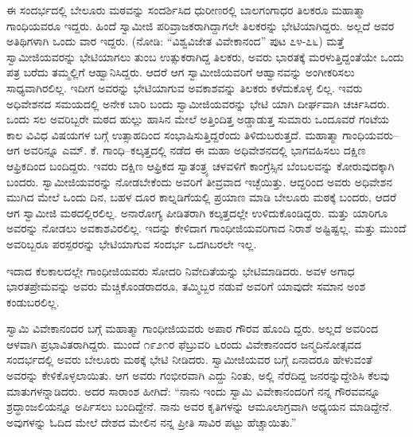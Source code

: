 ಈ ಸಂದರ್ಭದಲ್ಲಿ ಬೇಲೂರು ಮಠವನ್ನು ಸಂದರ್ಶಿಸಿದ ಧುರೀಣರಲ್ಲಿ ಬಾಲಗಂಗಾಧರ ತಿಲಕರೂ ಮಹಾತ್ಮಾ ಗಾಂಧಿಯವರೂ ಇದ್ದರು. ಹಿಂದೆ ಸ್ವಾಮೀಜಿ ಪರಿವ್ರಾಜಕರಾಗಿದ್ದಾಗಲೇ ತಿಲಕರನ್ನು ಭೇಟಿಯಾಗಿದ್ದರು. ಅಲ್ಲದೆ ಅವರ ಅತಿಥಿಗಳಾಗಿ ಒಂದು ವಾರ ಇದ್ದರು. (ನೋಡಿ: “ವಿಶ್ವವಿಜೇತ ವಿವೇಕಾನಂದ” ಪುಟ ೭೪-೭೬) ಮತ್ತೆ ಸ್ವಾಮೀಜಿಯವರನ್ನು ಭೇಟಿಯಾಗಲು ತುಂಬ ಉತ್ಸುಕರಾಗಿದ್ದ ತಿಲಕರು, ಅವರು ಭಾರತಕ್ಕೆ ಮರಳುತ್ತಿದ್ದಂತೆಯೇ ಒಂದು ಪತ್ರ ಬರೆದು ತಮ್ಮಲ್ಲಿಗೆ ಆಹ್ವಾನಿಸಿದ್ದರು. ಆದರೆ ಆಗ ಸ್ವಾಮೀಜಿಯವರಿಗೆ ಆಹ್ವಾನವನ್ನು ಅಂಗೀಕರಿಸಲು ಸಾಧ್ಯವಾಗಿರಲಿಲ್ಲ. ಇದೀಗ ಅವರನ್ನು ಭೇಟಿಯಾಗುವ ಅವಕಾಶವನ್ನು ತಿಲಕರು ಕಳೆದುಕೊಳ್ಳ ಲಿಲ್ಲ. ಇವರು ಅಧಿವೇಶನದ ಸಮಯದಲ್ಲಿ ಅನೇಕ ಬಾರಿ ಬಂದು ಸ್ವಾಮೀಜಿಯವರನ್ನು ಭೇಟಿ ಯಾಗಿ ದೀರ್ಘವಾಗಿ ಚರ್ಚಿಸಿದರು. ಒಂದು ಸಲ ಅವರಿಬ್ಬರೇ ಮಠದ ಹುಲ್ಲು ಹಾಸಿನ ಮೇಲೆ ಅತ್ತಿಂದಿತ್ತ ಅಡ್ಡಾಡುತ್ತ ಸುಮಾರು ಒಂದೂವರೆ ಗಂಟೆಯ ಕಾಲ ವಿವಿಧ ವಿಷಯಗಳ ಬಗ್ಗೆ ಉತ್ಸಾಹದಿಂದ ಸಂಭಾಷಿಸುತ್ತಿದ್ದರೆಂದು ತಿಳಿದುಬರುತ್ತದೆ. ಮಹಾತ್ಮಾ ಗಾಂಧಿಯವರು–ಆಗ ಅವರಿನ್ನೂ ಎಮ್. ಕೆ. ಗಾಂಧಿ–ಕಲ್ಕತ್ತದಲ್ಲಿ ನಡೆದ ಈ ಮಹಾ ಅಧಿವೇಶನದಲ್ಲಿ ಭಾಗವಹಿಸಲು ದಕ್ಷಿಣ ಆಫ್ರಿಕದಿಂದ ಬಂದಿದ್ದರು. ಇವರು ದಕ್ಷಿಣ ಆಫ್ರಿಕದ ಸ್ವಾತಂತ್ರ್ಯ ಚಳವಳಿಗೆ ಕಾಂಗ್ರೆಸ್ಸಿನ ಬೆಂಬಲವನ್ನು ಕೋರುವುದಕ್ಕಾಗಿ ಬಂದರು. ಸ್ವಾಮೀಜಿಯವರನ್ನು ನೋಡಬೇಕೆಂದು ಅವರಿಗೆ ತೀವ್ರವಾದ ಇಚ್ಛೆಯಿತ್ತು. ಆದ್ದರಿಂದ ಅವರು ಅಧಿವೇಶನ ಮುಗಿದ ಮೇಲೆ ಒಂದು ದಿನ, ಬಹಳ ದೂರ ಕಾಲ್ನಡಿಗೆಯಲ್ಲಿ ಪ್ರಯಾಣ ಮಾಡಿ ಬೇಲೂರು ಮಠಕ್ಕೆ ಬಂದರು, ಆದರೆ ಆಗ ಸ್ವಾಮೀಜಿ ಮಠದಲ್ಲಿರಲಿಲ್ಲ. ಅನಾರೋಗ್ಯ ಪೀಡಿತರಾಗಿ ಕಲ್ಕತ್ತದಲ್ಲೇ ಉಳಿದುಕೊಂಡಿದ್ದರು. ಮತ್ತು ಯಾರಿಗೂ ಅವರನ್ನು ನೋಡಲು ಅವಕಾಶವಿರಲಿಲ್ಲ. ಇದನ್ನು ಕೇಳಿದಾಗ ಗಾಂಧೀಜಿಯವರಿಗಾದ ನಿರಾಶೆ ಅಷ್ಟಿಷ್ಟಲ್ಲ. ಮತ್ತು ಮುಂದೆ ಅವರಿಬ್ಬರೂ ಪರಸ್ಪರರನ್ನು ಭೇಟಿಯಾಗುವ ಸಂದರ್ಭ ಒದಗಿಬರಲೇ ಇಲ್ಲ.

ಇದಾದ ಕೆಲಕಾಲದಲ್ಲೇ ಗಾಂಧೀಜಿಯವರು ಸೋದರಿ ನಿವೇದಿತೆಯನ್ನು ಭೇಟಿಮಾಡಿದರು. ಅವಳ ಅಗಾಧ ಭಾರತಪ್ರೇಮವನ್ನು ಅವರು ಮೆಚ್ಚಿಕೊಂಡರಾದರೂ, ತಮ್ಮಿಬ್ಬರ ನಡುವೆ ಅವರಿಗೆ ಯಾವುದೇ ಸಮಾನ ಅಂಶ ಕಂಡುಬರಲಿಲ್ಲ.

ಸ್ವಾಮಿ ವಿವೇಕಾನಂದರ ಬಗ್ಗೆ ಮಹಾತ್ಮಾ ಗಾಂಧೀಜಿಯವರು ಅಪಾರ ಗೌರವ ಹೊಂದಿ ದ್ದರು. ಅಲ್ಲದೆ ಅವರಿಂದ ಆಳವಾಗಿ ಪ್ರಭಾವಿತರಾಗಿದ್ದರು. ಮುಂದೆ ೧೯೨೧ರ ಫೆಬ್ರುವರಿ ೬ರಂದು ವಿವೇಕಾನಂದರ ಜನ್ಮದಿನೋತ್ಸವದ ಸಂದರ್ಭದಲ್ಲಿ ಅವರು ಬೇಲೂರು ಮಠಕ್ಕೆ ಭೇಟಿ ನೀಡಿದರು. ಸ್ವಾಮೀಜಿಯವರ ಬಗ್ಗೆ ಏನಾದರೂ ಹೇಳುವಂತೆ ಅವರನ್ನು ಕೇಳಿಕೊಳ್ಳಲಾಯಿತು. ಆಗ ಅವರು ಗಂಭೀರವಾಗಿ ಎದ್ದು ನಿಂತು, ಅಲ್ಲಿ ನೆರೆದಿದ್ದ ಜನರನ್ನುದ್ದೇಶಿಸಿ ಕೆಲವು ಮಾತುಗಳನ್ನಾಡಿದರು. ಅದರ ಸಾರಾಂಶ ಹೀಗಿದೆ: “ನಾನು ಇಂದು ಸ್ವಾಮಿ ವಿವೇಕಾನಂದರಿಗೆ ನನ್ನ ಗೌರವವನ್ನೂ ಶ್ರದ್ಧಾಂಜಲಿಯನ್ನೂ ಅರ್ಪಿಸಲು ಬಂದಿದ್ದೇನೆ. ನಾನು ಅವರ ಕೃತಿಗಳನ್ನು ಆಮೂಲಾಗ್ರವಾಗಿ ಅಧ್ಯಯನ ಮಾಡಿದ್ದೇನೆ. ಅವುಗಳನ್ನು ಓದಿದ ಮೇಲೆ ದೇಶದ ಮೇಲಿನ ನನ್ನ ಪ್ರೀತಿ ಸಾವಿರ ಪಟ್ಟು ಹೆಚ್ಚಾಯಿತು.”

